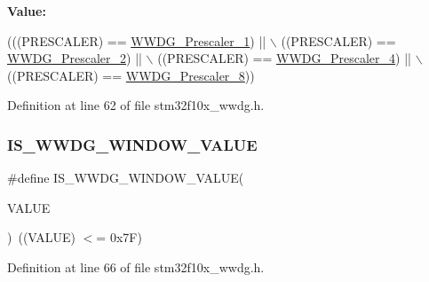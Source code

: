 {\bfseries Value\+:}
\begin{DoxyCode}
(((PRESCALER) == \hyperlink{group___w_w_d_g___prescaler_ga55780dcf60a252724f5aae2ca37d91c5}{WWDG\_Prescaler\_1}) || \(\backslash\)
                                      ((PRESCALER) == \hyperlink{group___w_w_d_g___prescaler_ga2ac67d0a7f8691b5ebf0d7d77d6b5f08}{WWDG\_Prescaler\_2}) || \(\backslash\)
                                      ((PRESCALER) == \hyperlink{group___w_w_d_g___prescaler_gab11714e1816967802a8421587e54a2eb}{WWDG\_Prescaler\_4}) || \(\backslash\)
                                      ((PRESCALER) == \hyperlink{group___w_w_d_g___prescaler_ga7a4933366603869726bd5ea547d99f02}{WWDG\_Prescaler\_8}))
\end{DoxyCode}


Definition at line 62 of file stm32f10x\+\_\+wwdg.\+h.

\mbox{\label{group___w_w_d_g___prescaler_gab6ea714a2380b7d6547ba97363887868}} 
\subsubsection{\texorpdfstring{I\+S\+\_\+\+W\+W\+D\+G\+\_\+\+W\+I\+N\+D\+O\+W\+\_\+\+V\+A\+L\+UE}{IS\_WWDG\_WINDOW\_VALUE}}
{\footnotesize\ttfamily \#define I\+S\+\_\+\+W\+W\+D\+G\+\_\+\+W\+I\+N\+D\+O\+W\+\_\+\+V\+A\+L\+UE(\begin{DoxyParamCaption}\item[{}]{V\+A\+L\+UE }\end{DoxyParamCaption})~((V\+A\+L\+UE) $<$= 0x7\+F)}



Definition at line 66 of file stm32f10x\+\_\+wwdg.\+h.

\mbox{\label{group___w_w_d_g___prescaler_ga55780dcf60a252724f5aae2ca37d91c5}} 
